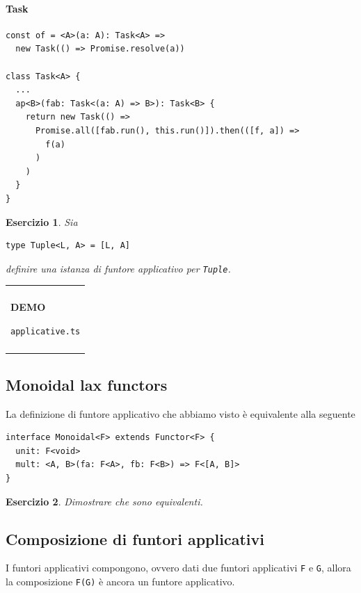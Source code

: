 \documentclass[12pt]{article}
\newtheorem{exercise}{Esercizio}[section]
\newenvironment{demo}
    {\begin{center}
    \begin{tabular}{|p{0.9\textwidth}|}
    \hline\\
    }
    {
    \\\\\hline
    \end{tabular}
    \end{center}
    }
\begin{document}
\paragraph{Task}

\begin{verbatim}
const of = <A>(a: A): Task<A> =>
  new Task(() => Promise.resolve(a))

class Task<A> {
  ...
  ap<B>(fab: Task<(a: A) => B>): Task<B> {
    return new Task(() =>
      Promise.all([fab.run(), this.run()]).then(([f, a]) =>
        f(a)
      )
    )
  }
}
\end{verbatim}

\begin{exercise}
Sia \begin{verbatim}type Tuple<L, A> = [L, A]\end{verbatim} definire una istanza di funtore applicativo per \texttt{Tuple}.
\end{exercise}

\begin{demo}
\begin{center}
\textbf{DEMO}

\texttt{applicative.ts}
\end{center}
\end{demo}

\subsection{Monoidal lax functors}

La definizione di funtore applicativo che abbiamo visto è equivalente alla seguente

\begin{verbatim}
interface Monoidal<F> extends Functor<F> {
  unit: F<void>
  mult: <A, B>(fa: F<A>, fb: F<B>) => F<[A, B]>
}
\end{verbatim}

\begin{exercise}
Dimostrare che sono equivalenti.
\end{exercise}

\subsection{Composizione di funtori applicativi}

I funtori applicativi compongono, ovvero dati due funtori applicativi \texttt{F} e \texttt{G},
allora la composizione \texttt{F(G)} è ancora un funtore applicativo.
\end{document}
